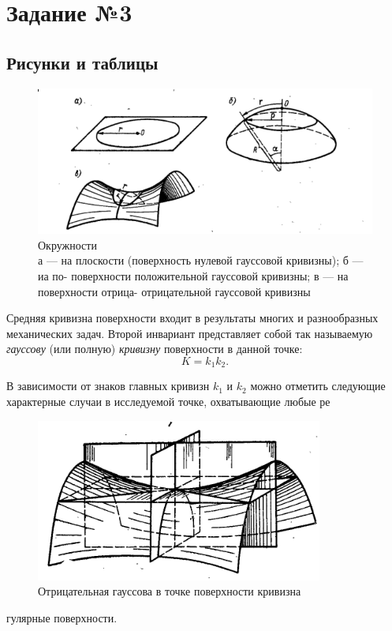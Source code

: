 \chapter{Задание №3}
\section{Рисунки и таблицы}

\begin{figure}[h]
    \includegraphics[scale=0.8]{fig_13}
    
    \caption{Окружности \\
    	а — на плоскости (поверхность нулевой гауссовой кривизны); б — иа по-
    	поверхности положительной гауссовой кривизны; в — на поверхности отрица-
    	отрицательной гауссовой кривизны}
    \label{eq:image_13}
\end{figure}


Средняя кривизна поверхности входит в результаты многих и разнообразных механических задач.
Второй инвариант представляет собой так называемую \textit{гауссову} (или полную) \textit{кривизну} поверхности в данной точке:
\begin{displaymath}
    K=k_1k_2.
\end{displaymath}


В зависимости от знаков главных кривизн $k_1$ и $k_2$ можно отметить следующие характерные случаи в исследуемой точке, охватывающие любые ре
\begin{figure}
    \includegraphics[width=\linewidth]{fig_9}
    \caption{Отрицательная гауссова
        в точке поверхности
        кривизна}
    \label{eq:image_9}
\end{figure} гулярные поверхности. 



